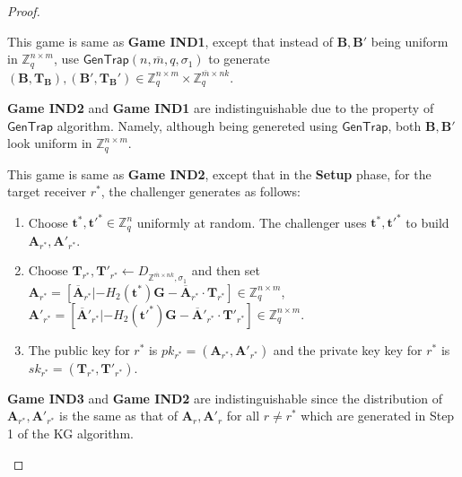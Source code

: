 \documentclass[a4paper,11pt,onecolumn]{elsarticle}
\begin{document}
\begin{proof}
\begin{description}
			  \item[Game IND2.]  This game is same as \textbf{Game IND1}, except that  instead of  $\mathbf{B}, \mathbf{B}'$ being uniform in $ \mathbb{Z}_q ^{n \times m}$, use $\textsf{GenTrap}(n, \overline{m},q, \sigma_1)$ to generate  $(\mathbf{B}, \mathbf{T}_{\textbf{B}}), (\mathbf{B}', \mathbf{T}_{\textbf{B}}') \in  \mathbb{Z}_q^{n \times m} \times \mathbb{Z}_q^{\overline{m} \times nk}$.
			  		
		\item  \textbf{Game IND2} and \textbf{Game IND1} are indistinguishable due to the property of $\textsf{GenTrap}$ algorithm. Namely, although being genereted using $\textsf{GenTrap}$, both $\mathbf{B}, \mathbf{B}'$ look uniform in $ \mathbb{Z}_q ^{n \times m}$.   

	  \item[Game IND3.] This game is same as \textbf{Game IND2}, except that in the \textbf{Setup} phase, for the target receiver $r^*$, the challenger generates as follows:
				  
				  	  	\begin{enumerate}
				  			 
				  			 \item Choose $\textbf{t}^*, \textbf{t}'^*\in \mathbb{Z}_q^n$ uniformly at random. The challenger uses  $\textbf{t}^*, \textbf{t}'^*$  to build $\mathbf{A}_{r^*}, \mathbf{A}'_{r^*}$.
				  			\item  Choose $ \mathbf{T}_{r^*}, \mathbf{T}'_{r^*} \leftarrow D_{\mathbb{Z}^{\overline{m} \times n k }, \sigma_1} $ and then set $\mathbf{A}_{r^*}=[\overline{\mathbf{A}}_{r^*}|-H_2(\textbf{t}^*)\mathbf{G}-\overline{\mathbf{A}}_{r^*}\cdot \mathbf{T}_{r^*}] \in \mathbb{Z}_q^{n \times m}$, $\mathbf{A}'_{r^*}=[\overline{\mathbf{A}}'_{r^*}|-H_2(\textbf{t}'^*)\mathbf{G}-\overline{\mathbf{A}}'_{r^*}\cdot \mathbf{T}'_{r^*}] \in \mathbb{Z}_q^{n \times m}$.
				  			\item The public key for $r^*$ is $pk_{r^*}=(\mathbf{A}_{r^*},\mathbf{A}'_{r^*})$ and the private key key for $r^*$ is $sk_{r^*}=(\mathbf{T}_{r^*},\mathbf{T}'_{r^*})$.
				  		 	  	\end{enumerate}	
				  		 	  	
				  		 	  	
	\item  \textbf{Game IND3} and \textbf{Game IND2} are indistinguishable since the distribution of  $\mathbf{A}_{r^*}, \mathbf{A}'_{r^*}$ is the same as that of $\mathbf{A}_{r}, \mathbf{A}'_{r}$ for all $r \neq r^*$ which are generated in Step 1 of the \textsf{KG} algorithm.  		
			  		  

\end{description}
\end{proof}
\end{document}
